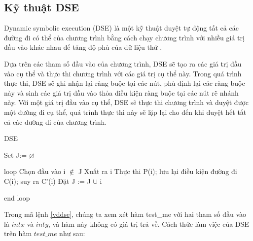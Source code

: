 \subsection{Kỹ thuật DSE}
Dynamic symbolic execution (DSE) là một kỹ thuật duyệt tự động tất cả các đường đi có thể của chương trình bằng cách chạy chương trình với nhiều giá trị đầu vào khác nhau để tăng độ phủ của dữ liệu thử \cite{xie2009fitness}.

Dựa trên các tham số đầu vào của chương trình, DSE sẽ tạo ra các giá trị đầu vào cụ thể và thực thi chương trình với các giá trị cụ thể này. Trong quá trình thực thi, DSE sẽ ghi nhận lại ràng buộc tại các nút, phủ định lại các ràng buộc này và sinh các giá trị đầu vào thỏa điều kiện ràng buộc tại các nút rẽ nhánh này. Với một giá trị đầu vào cụ thể, DSE sẽ thực thi chương trình và duyệt được một đường đi cụ thể, quá trình thực thi này sẽ lặp lại cho đến khi duyệt hết tất cả các đường đi của chương trình.

\begin{algorithm}
	\caption{DSE}
	\begin{algorithmic}	
		\item Set J:= $\varnothing $ 
		\item loop
		\subitem Chọn đầu vào i $\notin $ J 
		\subitem Xuất ra i
		\subitem Thực thi P(i); lưu lại điều kiện đường đi C(i); suy ra C'(i)
		\subitem Đặt J := J $\cup $ i			
		\item end loop
	\end{algorithmic}
\end{algorithm}



Trong mã lệnh \ref{vddse}, chúng ta xem xét hàm test\_me với hai tham số đầu vào là $int x$ và $int y$, và hàm này không có giá trị trả về. Cách thức làm việc của DSE trên hàm $test\_me$ như sau: 

